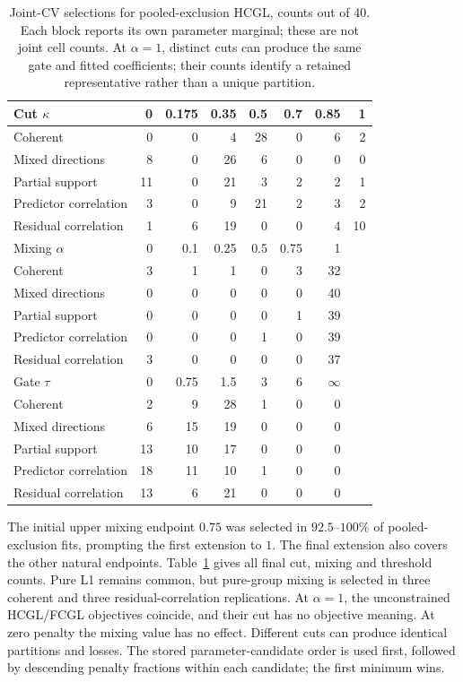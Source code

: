 \documentclass[11pt,a4paper]{article}
\begin{document}
\begin{table}[htbp]\centering\small\setlength{\tabcolsep}{4pt}
\caption{Joint-CV selections for pooled-exclusion HCGL, counts out of 40.
Each block reports its own parameter marginal; these are not joint cell counts.
At $\alpha=1$, distinct cuts can produce the same gate and fitted coefficients;
their counts identify a retained representative rather than a unique partition.}
\label{tab:learned-tuning-selections}
\begin{tabular}{lrrrrrrr}\toprule
Cut $\kappa$ & 0 & 0.175 & 0.35 & 0.5 & 0.7 & 0.85 & 1\\\midrule
Coherent & 0 & 0 & 4 & 28 & 0 & 6 & 2 \\
Mixed directions & 8 & 0 & 26 & 6 & 0 & 0 & 0 \\
Partial support & 11 & 0 & 21 & 3 & 2 & 2 & 1 \\
Predictor correlation & 3 & 0 & 9 & 21 & 2 & 3 & 2 \\
Residual correlation & 1 & 6 & 19 & 0 & 0 & 4 & 10 \\
\midrule
Mixing $\alpha$ & 0 & 0.1 & 0.25 & 0.5 & 0.75 & 1 &\\\midrule
Coherent & 3 & 1 & 1 & 0 & 3 & 32 & \\
Mixed directions & 0 & 0 & 0 & 0 & 0 & 40 & \\
Partial support & 0 & 0 & 0 & 0 & 1 & 39 & \\
Predictor correlation & 0 & 0 & 0 & 1 & 0 & 39 & \\
Residual correlation & 3 & 0 & 0 & 0 & 0 & 37 & \\
\midrule
Gate $\tau$ & 0 & 0.75 & 1.5 & 3 & 6 & $\infty$ &\\\midrule
Coherent & 2 & 9 & 28 & 1 & 0 & 0 & \\
Mixed directions & 6 & 15 & 19 & 0 & 0 & 0 & \\
Partial support & 13 & 10 & 17 & 0 & 0 & 0 & \\
Predictor correlation & 18 & 11 & 10 & 1 & 0 & 0 & \\
Residual correlation & 13 & 6 & 21 & 0 & 0 & 0 & \\
\bottomrule
\end{tabular}
\end{table}

The initial upper mixing endpoint $0.75$ was selected in $92.5$--$100\%$ of
pooled-exclusion fits, prompting the first extension to $1$. The final extension
also covers the other natural endpoints. Table~\ref{tab:learned-tuning-selections}
gives all final cut, mixing and threshold counts. Pure L1 remains common, but
pure-group mixing is selected in three coherent and three residual-correlation
replications. At $\alpha=1$, the unconstrained HCGL/FCGL objectives coincide,
and their cut has no objective meaning. At zero penalty the mixing value has
no effect. Different cuts can produce identical partitions and losses. The
stored parameter-candidate order is used first, followed by descending penalty
fractions within each candidate; the first minimum wins.
\end{document}
